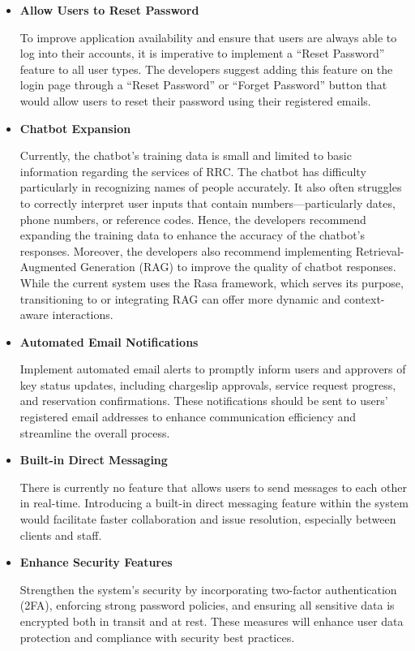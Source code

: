 \begin{itemize}
	
	\item \textbf{Allow Users to Reset Password}
	
	To improve application availability and ensure that users are always able to log into their accounts, it is imperative to implement a ``Reset Password'' feature to all user types. The developers suggest adding this feature on the login page through a ``Reset Password'' or ``Forget Password'' button that would allow users to reset their password using their registered emails.
	
	\item \textbf{Chatbot Expansion}
	
	Currently, the chatbot's training data is small and limited to basic information regarding the services of RRC. The chatbot has difficulty particularly in recognizing names of people accurately. It also often struggles to correctly interpret user inputs that contain numbers—particularly dates, phone numbers, or reference codes. Hence, the developers recommend expanding the training data to enhance the accuracy of the chatbot's responses. Moreover, the developers also recommend implementing Retrieval-Augmented Generation (RAG) to improve the quality of chatbot responses. While the current system uses the Rasa framework, which serves its purpose, transitioning to or integrating RAG can offer more dynamic and context-aware interactions. 
	
	\item \textbf{Automated Email Notifications}
	
	Implement automated email alerts to promptly inform users and approvers of key status updates, including chargeslip approvals, service request progress, and reservation confirmations. These notifications should be sent to users' registered email addresses to enhance communication efficiency and streamline the overall process.
	
	\item \textbf{Built-in Direct Messaging}
	
	There is currently no feature that allows users to send messages to each other in real-time. Introducing a built-in direct messaging feature within the system would facilitate faster collaboration and issue resolution, especially between clients and staff.
	
	\item \textbf{Enhance Security Features}
	
	Strengthen the system’s security by incorporating two-factor authentication (2FA), enforcing strong password policies, and ensuring all sensitive data is encrypted both in transit and at rest. These measures will enhance user data protection and compliance with security best practices.
	

\end{itemize}

